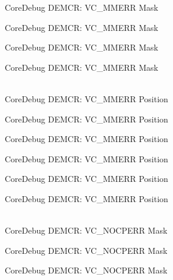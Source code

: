 \begin{DoxyRefList}
\label{deprecated__deprecated000354}%
%
Core\+Debug DEMCR:\+ VC\+\_\+\+MMERR Mask 

\label{deprecated__deprecated000430}%
%
Core\+Debug DEMCR:\+ VC\+\_\+\+MMERR Mask 

\label{deprecated__deprecated000519}%
%
Core\+Debug DEMCR:\+ VC\+\_\+\+MMERR Mask 

\label{deprecated__deprecated000621}%
%
Core\+Debug DEMCR:\+ VC\+\_\+\+MMERR Mask  
\item[{\parbox[t]{\linewidth}{Global \doxylink{group__CMSIS__CoreDebug_ga444454f7c7748e76cd76c3809c887c41}{Core\+Debug\+\_\+\+DEMCR\+\_\+\+VC\+\_\+\+MMERR\+\_\+\+Pos} }}]\hfill \\
\label{deprecated__deprecated000067}%
%
Core\+Debug DEMCR:\+ VC\+\_\+\+MMERR Position 

\label{deprecated__deprecated000211}%
%
Core\+Debug DEMCR:\+ VC\+\_\+\+MMERR Position 

\label{deprecated__deprecated000353}%
%
Core\+Debug DEMCR:\+ VC\+\_\+\+MMERR Position 

\label{deprecated__deprecated000429}%
%
Core\+Debug DEMCR:\+ VC\+\_\+\+MMERR Position 

\label{deprecated__deprecated000518}%
%
Core\+Debug DEMCR:\+ VC\+\_\+\+MMERR Position 

\label{deprecated__deprecated000620}%
%
Core\+Debug DEMCR:\+ VC\+\_\+\+MMERR Position  
\item[{\parbox[t]{\linewidth}{Global \doxylink{group__CMSIS__CoreDebug_ga03ee58b1b02fdbf21612809034562f1c}{Core\+Debug\+\_\+\+DEMCR\+\_\+\+VC\+\_\+\+NOCPERR\+\_\+\+Msk} }}]\hfill \\
\label{deprecated__deprecated000066}%
%
Core\+Debug DEMCR:\+ VC\+\_\+\+NOCPERR Mask 

\label{deprecated__deprecated000210}%
%
Core\+Debug DEMCR:\+ VC\+\_\+\+NOCPERR Mask 

\label{deprecated__deprecated000352}%
%
Core\+Debug DEMCR:\+ VC\+\_\+\+NOCPERR Mask 


\end{DoxyRefList}
